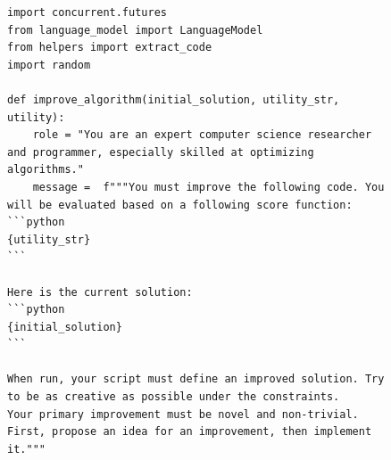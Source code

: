 \documentclass{article} %
\begin{document}
\begin{figure}[h]
%
  \centering %
\vspace{-12pt}
\begin{mybox}
\begin{lstlisting}[style=mystyle]
import concurrent.futures
from language_model import LanguageModel
from helpers import extract_code
import random

def improve_algorithm(initial_solution, utility_str, utility):
    role = "You are an expert computer science researcher and programmer, especially skilled at optimizing algorithms."
    message =  f"""You must improve the following code. You will be evaluated based on a following score function:
```python
{utility_str}
```

Here is the current solution:
```python
{initial_solution}
```

When run, your script must define an improved solution. Try to be as creative as possible under the constraints.
Your primary improvement must be novel and non-trivial. First, propose an idea for an improvement, then implement it."""


\end{lstlisting}
\end{mybox}
\end{figure}
\end{document}

